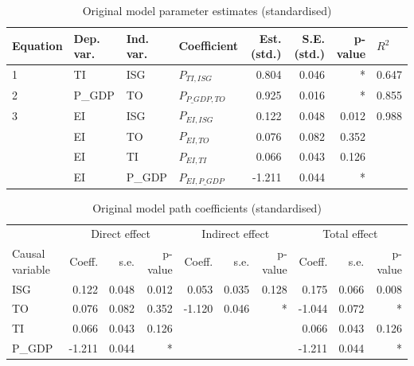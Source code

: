 \documentclass[11pt,a4paper]{article}
\begin{document}
\begin{table}[tbp]
\centering
\begin{adjustbox}{max width=\textwidth}
\begin{tabular}{llllrrrl}
\toprule
Equation & Dep. var. & Ind. var. &      Coefficient &  Est. (std.) &  S.E. (std.) & p-value & $R^{2}$ \\
\midrule
       1 &        TI &       ISG &     $P_{TI,ISG}$ &        0.804 &        0.046 &       * &   0.647 \\
       2 &    P\_GDP &        TO &  $P_{P\_GDP,TO}$ &        0.925 &        0.016 &       * &   0.855 \\
       3 &        EI &       ISG &     $P_{EI,ISG}$ &        0.122 &        0.048 &   0.012 &   0.988 \\
         &        EI &        TO &      $P_{EI,TO}$ &        0.076 &        0.082 &   0.352 &         \\
         &        EI &        TI &      $P_{EI,TI}$ &        0.066 &        0.043 &   0.126 &         \\
         &        EI &    P\_GDP &  $P_{EI,P\_GDP}$ &       -1.211 &        0.044 &       * &         \\\bottomrule
\end{tabular}
\end{adjustbox}
\caption{Original model parameter estimates (standardised)}
\label{tab:original_estimates}
\end{table}

\begin{table}[tbp]
\centering
\begin{adjustbox}{max width=\textwidth}
\begin{tabular}{l|rrr|rrr|rrr}
\toprule
 				& \multicolumn{3}{c|}{Direct effect}  & \multicolumn{3}{c|}{Indirect effect} & \multicolumn{3}{c}{Total effect} \\
Causal variable & Coeff. & s.e. & p-value & Coeff. & s.e. & p-value & Coeff. & s.e. & p-value \\
\midrule
            ISG &     0.122 &   0.048 &      0.012 &     0.053 &   0.035 &      0.128 &     0.175 &   0.066 &      0.008 \\
             TO &     0.076 &   0.082 &      0.352 &    -1.120 &   0.046 &          * &    -1.044 &   0.072 &          * \\
             TI &     0.066 &   0.043 &      0.126 &           &         &            &     0.066 &   0.043 &      0.126 \\
         P\_GDP &    -1.211 &   0.044 &          * &           &         &            &    -1.211 &   0.044 &          * \\
\bottomrule
\end{tabular}
\end{adjustbox}
\caption{Original model path coefficients (standardised)}
\label{tab:original_path_coeff}
\end{table}
\end{document}

